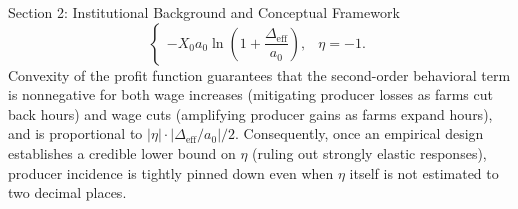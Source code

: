 \begin{llmdraft}{Section 2: Institutional Background and Conceptual Framework}
\begin{equation}
\begin{cases}
    -X_0 a_0 \ln\!\left(1 + \dfrac{\Delta_{\text{eff}}}{a_0}\right), & \eta = -1.
  \end{cases}
  \label{eq:ce_formula}
\end{equation}
Convexity of the profit function guarantees that the second-order behavioral
term is nonnegative for both wage increases (mitigating producer losses as
farms cut back hours) and wage cuts (amplifying producer gains as farms expand
hours), and is proportional to $|\eta| \cdot |\Delta_{\text{eff}}/a_0| / 2$.
Consequently, once an empirical design establishes a credible lower bound on
$\eta$ (ruling out strongly elastic responses), producer incidence is tightly
pinned down even when $\eta$ itself is not estimated to two decimal places.
\end{llmdraft}

